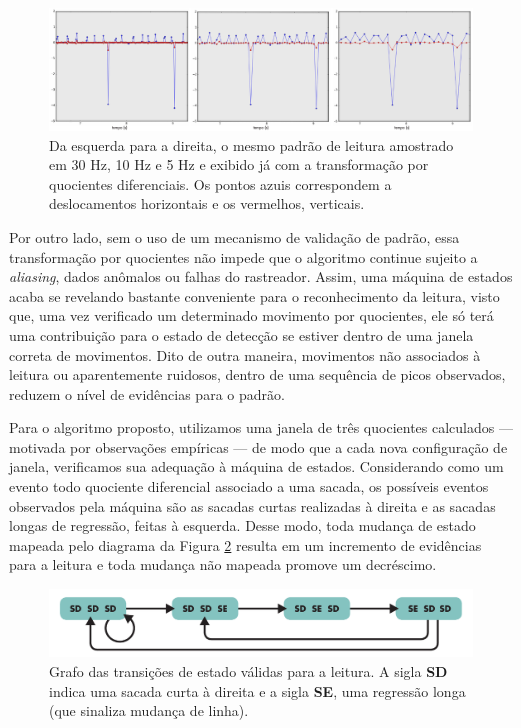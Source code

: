 \documentclass[12pt]{article}
\begin{document}
		\begin{figure}[!ht]
			\centering
			\includegraphics[width=16.5cm]{imgs/quocientes.png}
			\caption{\footnotesize {Da esquerda para a direita, o mesmo padrão de leitura amostrado em 30 Hz, 10 Hz e 5 Hz e exibido já com a transformação por quocientes diferenciais. Os pontos azuis correspondem a deslocamentos horizontais e os vermelhos, verticais.}}
			\label{fig:quociente}
			\vspace{5mm}
		\end{figure}
		
		Por outro lado, sem o uso de um mecanismo de validação de padrão, essa transformação por quocientes não impede que o algoritmo continue sujeito a \textit{aliasing}, dados anômalos ou falhas do rastreador. Assim, uma máquina de estados acaba se revelando bastante conveniente para o reconhecimento da leitura, visto que, uma vez verificado um determinado movimento por quocientes, ele só terá uma contribuição para o estado de detecção se estiver dentro de uma janela correta de movimentos. Dito de outra maneira, movimentos não associados à leitura ou aparentemente ruidosos, dentro de uma sequência de picos observados, reduzem o nível de evidências para o padrão.
		
		Para o algoritmo proposto, utilizamos uma janela de três quocientes calculados --- motivada por observações empíricas --- de modo que a cada nova configuração de janela, verificamos sua adequação à máquina de estados. Considerando como um evento todo quociente diferencial associado a uma sacada, os possíveis eventos observados pela máquina são as sacadas curtas realizadas à direita e as sacadas longas de regressão, feitas à esquerda. Desse modo, toda mudança de estado mapeada pelo diagrama da Figura \ref{fig:maquina} resulta em um incremento de evidências para a leitura e toda mudança não mapeada promove um decréscimo.
		
		\begin{figure}[!ht]
			\centering
			\includegraphics[width=16.5cm]{imgs/maquina_estados.png}
			\caption{\footnotesize {Grafo das transições de estado válidas para a leitura. A sigla \textbf{SD} indica uma sacada curta à direita e a sigla \textbf{SE}, uma regressão longa (que sinaliza mudança de linha).}}
			\label{fig:maquina}
			\vspace{5mm}
		\end{figure}
		
\end{document}
